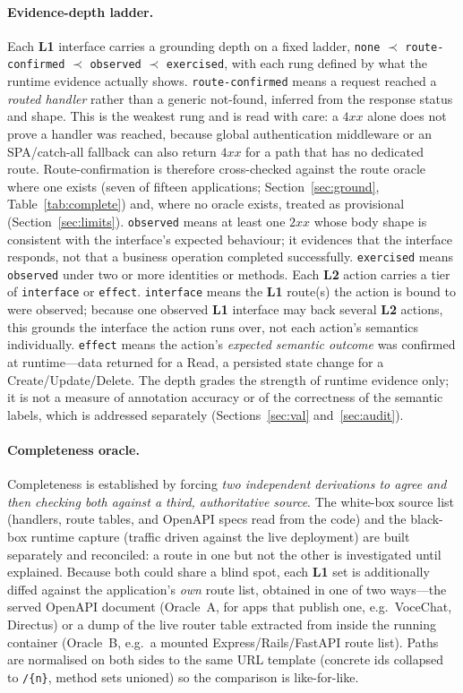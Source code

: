 \documentclass[11pt,a4paper]{article}
\newcommand{\cd}[1]{\lstinline[basicstyle=\ttfamily\small]|#1|}
\renewcommand{\L}[1]{\textbf{L#1}}
\begin{document}
\paragraph{Evidence-depth ladder.} Each \L1 interface carries a grounding depth on a
fixed ladder, \cd{none} $\prec$ \cd{route-confirmed} $\prec$ \cd{observed} $\prec$
\cd{exercised}, with each rung defined by what the runtime evidence actually shows.
\cd{route-confirmed} means a request reached a \emph{routed handler} rather than a generic
not-found, inferred from the response status and shape. This is the weakest rung and is read
with care: a $4xx$ alone does not prove a handler was reached, because global authentication
middleware or an SPA/catch-all fallback can also return $4xx$ for a path that has no
dedicated route. Route-confirmation is therefore cross-checked against the route oracle where
one exists (seven of fifteen applications; Section~\ref{sec:ground}, Table~\ref{tab:complete})
and, where no oracle exists, treated as provisional (Section~\ref{sec:limits}).
\cd{observed} means at least one $2xx$ whose body shape is consistent with the interface's
expected behaviour; it evidences that the interface responds, not that a business operation
completed successfully. \cd{exercised} means \cd{observed} under two or more identities or
methods. Each \L2 action carries a tier of \cd{interface} or \cd{effect}. \cd{interface}
means the \L1 route(s) the action is bound to were observed; because one observed \L1
interface may back several \L2 actions, this grounds the interface the action runs over, not
each action's semantics individually. \cd{effect} means the action's \emph{expected semantic
outcome} was confirmed at runtime---data returned for a Read, a persisted state change for a
Create/Update/Delete. The depth grades the strength of runtime evidence only; it is not a
measure of annotation accuracy or of the correctness of the semantic labels, which is
addressed separately (Sections~\ref{sec:val} and~\ref{sec:audit}).

\paragraph{Completeness oracle.} Completeness is established by forcing \emph{two
independent derivations to agree and then checking both against a third, authoritative
source}. The white-box source list (handlers, route tables, and OpenAPI specs read from
the code) and the black-box runtime capture (traffic driven against the live deployment)
are built separately and reconciled: a route in one but not the other is investigated
until explained. Because both could share a blind spot, each \L1 set is additionally
diffed against the application's \emph{own} route list, obtained in one of two ways---the
served OpenAPI document (Oracle~A, for apps that publish one, e.g.\ VoceChat, Directus) or
a dump of the live router table extracted from inside the running container (Oracle~B,
e.g.\ a mounted Express/Rails/FastAPI route list). Paths are normalised on both sides to
the same URL template (concrete ids collapsed to \cd{/{n}}, method sets unioned) so the
comparison is like-for-like.
\end{document}
